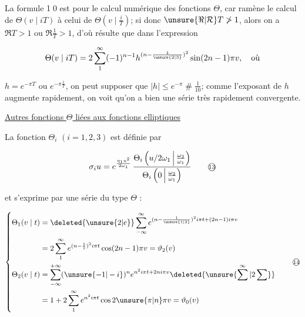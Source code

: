 La formule \textcircled{\scriptsize 10} est  pour le calcul numérique des fonctions $\Theta$, car ramène le calcul de $\Theta(v\mid iT)$ à celui de $\Theta(v\mid\frac iT)$; si donc $\unsure{\Re|\mathcal R}T\ngtr1$, alors on a $\Re T>1$ ou $\Re\frac1T>1$, d'où résulte que dans l'expression

\[
\Theta(v\mid iT)=2\sum_1^\infty(-1)^{n-1}h^{(n-\frac1{\unsure{2|3}})^2}\sin(2n-1)\pi v,\quad\text{où}
\]

$h=e^{-\pi T}$ ou $e^{-\pi\frac1T}$, on peut supposer que $|h|\leq e^{-\pi}\mathrel{\#}\frac1{10}$; comme l'exposant de $h$ augmente rapidement, on voit qu'on a bien une série très rapidement convergente.

\uline{Autres fonctions $\Theta$ liées aux fonctions elliptiques}

La fonction $\Theta_i$ $(i=1,2,3)$ est définie par

\[
\sigma_i u=e^{\frac{\eta_1u^2}{2\omega_1}}\,
\frac{\Theta_i\left(u/2\omega_1\,\middle|\,\frac{\omega_2}{\omega_1}\right)}
{\Theta_i\left(0\,\middle|\,\frac{\omega_2}{\omega_1}\right)}
\tag*{\textcircled{\scriptsize 13}}
\]

et s'exprime par une série du type $\Theta$ :

\[
\left\{\begin{aligned}
\Theta_1(v\mid t)&=\deleted{\unsure{2|e}}\sum_{-\infty}^\infty e^{(n-\frac1{\unsure{1|2}})^2i\pi t+(2n-1)i\pi v}\\
&=2\sum_1^\infty e^{(n-\frac11)^2i\pi t}\cos(2n-1)\pi v=\vartheta_2(v)\\
\Theta_2(v\mid t)&=\sum_{-\infty}^{+\infty}(\unsure{-1|-i})^n e^{n^2i\pi t+2ni\pi v}\deleted{\unsure{\sum^{\infty}|2\sum}}\\
&=1+2\sum_1^\infty e^{n^2i\pi t}\cos2\unsure{\pi|n}\pi v=\vartheta_0(v)
\end{aligned}\right.
\tag*{\textcircled{\scriptsize 14}}
\]

